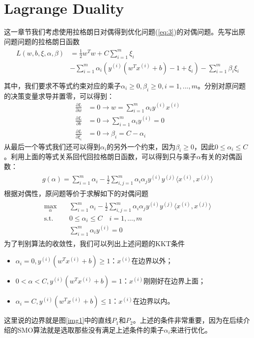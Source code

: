 \documentclass[11pt]{article}
\begin{document}
\section{Lagrange Duality}\label{duality}
这一章节我们考虑使用拉格朗日对偶得到优化问题(\ref{eq:3})的对偶问题。先写出原问题问题的拉格朗日函数
\begin{align}
\begin{split}
L(w, b, \xi, \alpha, \beta) &= \frac{1}{2}w^Tw + C\sum_{i=1}^m\xi_i\\
&-\sum_{i=1}^m\alpha_i\left(y^{(i)}(w^Tx^{(i)} +b) - 1 + \xi_i\right) - \sum_{i=1}^m\beta_i\xi_i\\
\end{split}
\end{align}
其中，我们要求不等式约束对应的乘子$\alpha_i\geq 0, \beta_i\geq0, i=1,...,m$。分别对原问题的决策变量求导并置零，可以得到：
\begin{align}
\frac{\partial L}{\partial w}&=0\to w = \sum_{i=1}^m\alpha_iy^{(i)}x^{(i)}\\
\frac{\partial L}{\partial b}&=0\to\sum_{i=1}^m\alpha_iy^{(i)}=0\\
\frac{\partial L}{\partial \xi_i}&=0\to\beta_i= C-\alpha_i
\end{align}
从最后一个等式我们还可以得到$\alpha_i$的另外一个约束，因为$\beta_i\geq 0$，因此$0\leq \alpha_i \leq C$。利用上面的等式关系回代回拉格朗日函数，可以得到只与乘子$\alpha$有关的对偶函数：
\begin{align}
\begin{split}
g(\alpha) =\sum_{i=1}^m\alpha_i-\frac{1}{2}\sum_{i,j=1}^m\alpha_i\alpha_jy^{(i)}y^{(j)}\langle x^{(i)}, x^{(j)}\rangle
\end{split}
\end{align}
根据对偶性，原问题等价于求解如下的对偶问题
\begin{align}\label{eq:1}
\begin{split}
\max_\alpha\quad&\sum_{i=1}^m\alpha_i-\frac{1}{2}\sum_{i,j=1}^m\alpha_i\alpha_jy^{(i)}y^{(j)}\langle x^{(i)}, x^{(j)}\rangle\\
\text{s.t.}\quad&0\leq\alpha_i\leq C\quad i=1,...,m\\
&\sum_{i=1}^m\alpha_iy^{(i)}=0
\end{split}
\end{align}
为了判别算法的收敛性，我们可以列出上述问题的KKT条件
\begin{itemize}
\item $\alpha_i=0, y^{(i)}(w^Tx^{(i)}+b)\geq 1$：$x^{(i)}$在边界以外；
\item $0< \alpha< C, y^{(i)}(w^Tx^{(i)}+b) = 1$：$x^{(i)}$刚刚好在边界上面；
\item $\alpha_i=C, y^{(i)}(w^Tx^{(i)}+b) \leq 1$：$x^{(i)}$在边界以内。
\end{itemize}
这里说的边界就是图\ref{img1}中的直线$P_1$和$P_2$。上述的条件非常重要，因为在后续介绍的SMO算法就是选取那些没有满足上述条件的乘子$\alpha_i$来进行优化。
\end{document}
